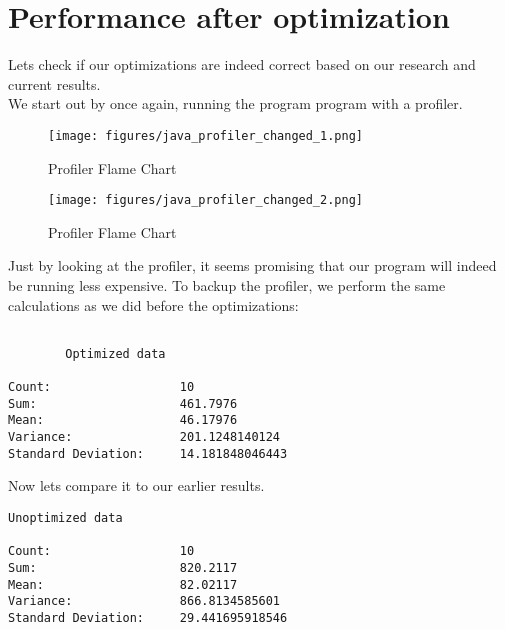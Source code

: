 \section{Performance after optimization}
Lets check if our optimizations are indeed correct based on our research and current results.\\
We start out by once again, running the program program with a profiler.

\begin{figure}[h]
    \caption{Profiler Flame Chart}
    \texttt{[image: figures/java\_profiler\_changed\_1.png]}
    \label{fig:call-tree-unchanged}
\end{figure}

\begin{figure}[h]
    \caption{Profiler Flame Chart}
    \texttt{[image: figures/java\_profiler\_changed\_2.png]}
    \label{fig:call-tree-unchanged}
\end{figure}

Just by looking at the profiler, it seems promising that our program will indeed be running less expensive.
To backup the profiler, we perform the same calculations as we did before the optimizations:

\begin{lstlisting}[]
        
        Optimized data

Count:                  10
Sum:                    461.7976
Mean:                   46.17976
Variance:               201.1248140124
Standard Deviation:     14.181848046443 
\end{lstlisting}

\vspace{30px}
Now lets compare it to our earlier results.
\vspace{20px}

\begin{lstlisting}[]        
        Unoptimized data

Count:                  10
Sum:                    820.2117
Mean:                   82.02117
Variance:               866.8134585601
Standard Deviation:     29.441695918546
\end{lstlisting}